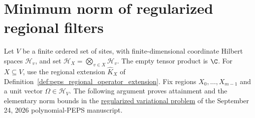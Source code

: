 \section{Minimum norm of regularized regional filters}
\label{sec:peps_regularized_patch_minimum}

Let $V$ be a finite ordered set of sites, with finite-dimensional coordinate
Hilbert spaces $\mathcal H_v$, and set
$\mathcal H_X=\bigotimes_{v\in X}\mathcal H_v$.
The empty tensor product is $\C$.
For $X\subseteq V$, use the regional extension $\widehat K_X$ of
Definition~\ref{def:peps_regional_operator_extension}.
Fix regions $X_0,\ldots,X_{m-1}$ and a unit vector $\Omega\in\mathcal H_V$.
The following argument proves attainment and the elementary norm bounds in the
\href{https://github.com/openai/math/blob/adc7f1241b42e322a6451854ab7e4b4c146bf78a/preprints/Polynomial-PEPS-approximation-of-gapped-square-grid-ground-states-September-24-2026/build/sections/03-patches.tex\#L68-L99}{regularized variational problem}
of the September 24, 2026 polynomial-PEPS manuscript.

